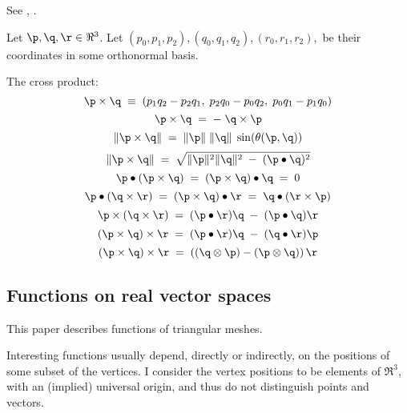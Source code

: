 See \cite[p.~85, ex.~4-9]{Spivak:1965:CalculusOnManifolds}, .

Let $\p, \q, \r \in \Re^3$.
Let $(p_0,p_1,p_2), (q_0,q_1,q_2), (r_0,r_1,r_2), $ be their coordinates
in some orthonormal basis.

The cross product:
\begin{equation}
\p \times \q  \; \equiv \; (p_1 q_2 - p_2 q_1, \; p_2 q_0 - p_0 q_2, \; p_0 q_1 - p_1 q_0)
\end{equation}
\begin{equation}
\p \times \q  \; = \; - \; \q \times \p
\end{equation}
\begin{equation}
\| \p \times \q \| \; = \; \| \p \| \; \| \q \| \; \sin(\theta(\p,\q))
\end{equation}
\begin{equation}
\| \p \times \q \|  \; = \;  \sqrt{\| \p \|^2 \| \q \|^2 \; - \; (\p \bullet \q)^2}
\end{equation}
\begin{equation}
\p \bullet ( \p \times \q ) \; = \; ( \p \times \q ) \bullet \q \; = \; 0
\end{equation}
\begin{equation}
\label{eq:dot_cross}
\p \bullet ( \q \times \r ) \; = \; ( \p \times \q ) \bullet \r \; = \; \q \bullet ( \r \times \p )
\end{equation}
\begin{equation}
\p \times ( \q \times \r ) \; = \; ( \p \bullet \r ) \q \; - \; (\p \bullet \q) \r
\end{equation}
\begin{equation}
( \p \times \q ) \times \r \; = \; ( \p \bullet \r ) \q \; - \; (\q \bullet \r) \p
\end{equation}
\begin{equation}
( \p \times \q ) \times \r \; = \; \left((\q \otimes \p) - (\p \otimes \q)\right) \r
\end{equation}



\subsection{Functions on real vector spaces}
\label{sec:functions}

This paper describes functions of triangular meshes.

Interesting functions usually depend, directly or indirectly,
on the positions of some subset of the vertices.
I consider the vertex positions to be elements of $\Re^3$,
with an (implied) universal origin,
and thus do not distinguish points and vectors.

